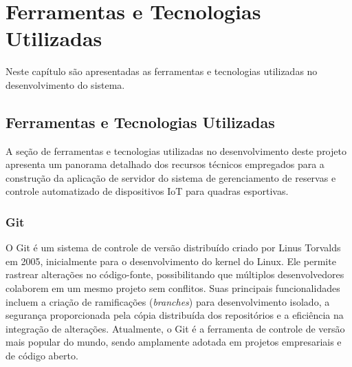 \chapter{Ferramentas e Tecnologias Utilizadas}\label{cap:tecnologias}

Neste capítulo são apresentadas as ferramentas e tecnologias utilizadas no desenvolvimento do sistema.

\section{Ferramentas e Tecnologias Utilizadas}\label{sec:ferramentas_tecnologias}

A seção de ferramentas e tecnologias utilizadas no desenvolvimento deste projeto apresenta um panorama detalhado dos recursos técnicos empregados para a construção da aplicação de servidor do sistema de gerenciamento de reservas e controle automatizado de dispositivos IoT para quadras esportivas. 

\subsection{Git}

O Git é um sistema de controle de versão distribuído criado por Linus Torvalds em 2005, inicialmente para o desenvolvimento do kernel do Linux. Ele permite rastrear alterações no código-fonte, possibilitando que múltiplos desenvolvedores colaborem em um mesmo projeto sem conflitos. Suas principais funcionalidades incluem a criação de ramificações (\textit{branches}) para desenvolvimento isolado, a segurança proporcionada pela cópia distribuída dos repositórios e a eficiência na integração de alterações. Atualmente, o Git é a ferramenta de controle de versão mais popular do mundo, sendo amplamente adotada em projetos empresariais e de código aberto.  

